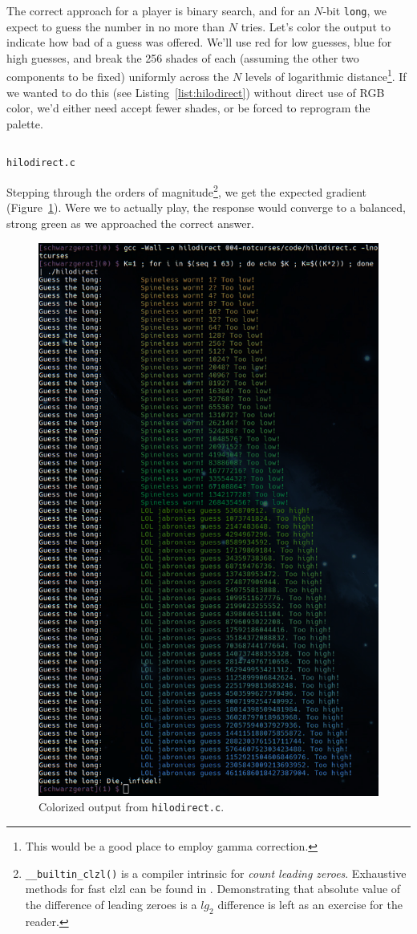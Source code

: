 \documentclass[letterpaper,10pt]{article}
\begin{document}
The correct approach for a player is binary search, and for an $N$-bit
\texttt{long}, we expect to guess the number in no more than $N$ tries. Let's
color the output to indicate how bad of a guess was offered. We'll use red for
low guesses, blue for high guesses, and break the 256 shades of each (assuming
the other two components to be fixed) uniformly across the $N$ levels of
logarithmic distance\footnote{This would be a good place to employ \gls{gamma correction}.}.
If we wanted to do this (see Listing~\ref{list:hilodirect}) without direct use of RGB color,
we'd either need accept fewer shades, or be forced to reprogram the palette.

\begin{listing}[!htbp]
\inputminted[]{C}{code/hilodirect.c}
\caption{\texttt{hilodirect.c}}
\label{list:hilodirect}
\end{listing}

Stepping through the orders of magnitude\footnote{\texttt{\_\_builtin\_clzl()}
is a compiler intrinsic for \textit{count leading zeroes}. Exhaustive methods
for fast clzl can be found in \cite{hackerdelight}. Demonstrating that
absolute value of the difference of leading zeroes is a $lg_{2}$ difference
is left as an exercise for the reader.}, we get the expected gradient
(Figure~\ref{fig:colorguess}). Were we to actually play, the response would
converge to a balanced, strong green as we approached the correct answer.

\begin{figure}[!htbp]
\centering \includegraphics[width=.75\linewidth]{media/hilodirect.png}
\caption{Colorized output from \texttt{hilodirect.c}.}
\label{fig:colorguess}
\end{figure}
\end{document}
